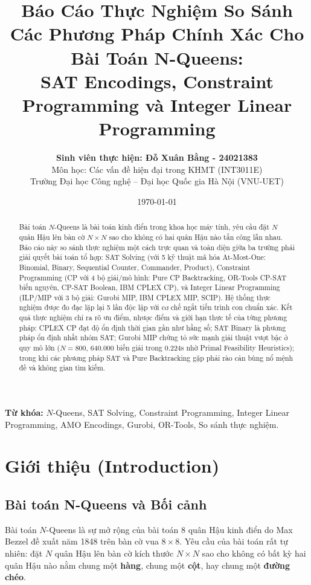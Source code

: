 \documentclass[a4paper,11pt]{article}
\title{\textbf{\LARGE Báo Cáo Thực Nghiệm So Sánh Các Phương Pháp Chính Xác Cho Bài Toán N-Queens: \\ SAT Encodings, Constraint Programming và Integer Linear Programming}}
\author{
    \textbf{Sinh viên thực hiện: Đỗ Xuân Bằng - 24021383}\\
    Môn học: Các vấn đề hiện đại trong KHMT (INT3011E) \\
    Trường Đại học Công nghệ -- Đại học Quốc gia Hà Nội (VNU-UET)
}
\date{\today}
\begin{document}
\maketitle

\begin{abstract}
\noindent Bài toán $N$-Queens là bài toán kinh điển trong khoa học máy tính, yêu cầu đặt $N$ quân Hậu lên bàn cờ $N \times N$ sao cho không có hai quân Hậu nào tấn công lẫn nhau. Báo cáo này so sánh thực nghiệm một cách trực quan và toàn diện giữa ba trường phái giải quyết bài toán tổ hợp: SAT Solving (với 5 kỹ thuật mã hóa At-Most-One: Binomial, Binary, Sequential Counter, Commander, Product), Constraint Programming (CP với 4 bộ giải/mô hình: Pure CP Backtracking, OR-Tools CP-SAT biến nguyên, CP-SAT Boolean, IBM CPLEX CP), và Integer Linear Programming (ILP/MIP với 3 bộ giải: Gurobi MIP, IBM CPLEX MIP, SCIP). Hệ thống thực nghiệm được đo đạc lặp lại 5 lần độc lập với cơ chế ngắt tiến trình con chuẩn xác. Kết quả thực nghiệm chỉ ra rõ ưu điểm, nhược điểm và giới hạn thực tế của từng phương pháp: CPLEX CP đạt độ ổn định thời gian gần như hằng số; SAT Binary là phương pháp ổn định nhất nhóm SAT; Gurobi MIP chứng tỏ sức mạnh giải thuật vượt bậc ở quy mô lớn ($N=800$, 640.000 biến giải trong $0.224$s nhờ Primal Feasibility Heuristics); trong khi các phương pháp SAT và Pure Backtracking gặp phải rào cản bùng nổ mệnh đề và không gian tìm kiếm.
\end{abstract}

\vspace{0.5em}
\noindent\textbf{Từ khóa:} $N$-Queens, SAT Solving, Constraint Programming, Integer Linear Programming, AMO Encodings, Gurobi, OR-Tools, So sánh thực nghiệm.

\vspace{1.5em}

\section{Giới thiệu (Introduction)}

\subsection{Bài toán N-Queens và Bối cảnh}
Bài toán $N$-Queens là sự mở rộng của bài toán 8 quân Hậu kinh điển do Max Bezzel đề xuất năm 1848 trên bàn cờ vua $8 \times 8$. Yêu cầu của bài toán rất tự nhiên: đặt $N$ quân Hậu lên bàn cờ kích thước $N \times N$ sao cho không có bất kỳ hai quân Hậu nào nằm chung một \textbf{hàng}, chung một \textbf{cột}, hay chung một \textbf{đường chéo}.
\end{document}
